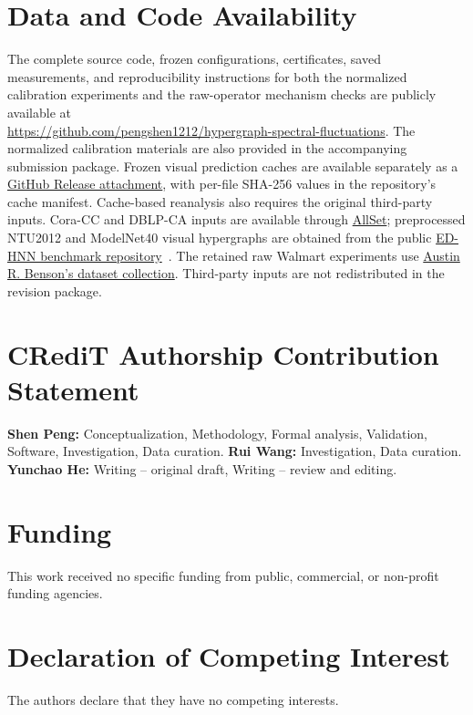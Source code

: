 \documentclass[preprint,11pt]{elsarticle}
\begin{document}
\section*{Data and Code Availability}
The complete source code, frozen configurations, certificates, saved
measurements, and reproducibility instructions for both the normalized
calibration experiments and the raw-operator mechanism checks are publicly
available at\\
\url{https://github.com/pengshen1212/hypergraph-spectral-fluctuations}.
The normalized calibration materials are also provided in the accompanying
submission package.
Frozen visual prediction caches are available separately as a
\href{https://github.com/pengshen1212/hypergraph-spectral-fluctuations/releases/tag/paper1-visual-cache-20261022}{GitHub Release attachment},
with per-file SHA-256 values in the repository's cache manifest.
Cache-based reanalysis also requires the original third-party inputs.
Cora-CC and DBLP-CA inputs are available through
\href{https://github.com/jianhao2016/AllSet}{AllSet}; preprocessed
NTU2012 and ModelNet40 visual hypergraphs are obtained from the public
\href{https://github.com/Graph-COM/ED-HNN}{ED-HNN benchmark repository}~\cite{wang2023edhnn}.
The retained raw
Walmart experiments use
\href{https://www.cs.cornell.edu/~arb/data/walmart-trips/}{Austin R. Benson's dataset collection}.
Third-party inputs are not redistributed in the revision package.

\section*{CRediT Authorship Contribution Statement}
\textbf{Shen Peng:} Conceptualization, Methodology, Formal analysis,
Validation, Software, Investigation, Data curation.
\textbf{Rui Wang:} Investigation, Data curation.
\textbf{Yunchao He:} Writing -- original draft, Writing -- review and editing.

\section*{Funding}
This work received no specific funding from public, commercial, or
non-profit funding agencies.

\section*{Declaration of Competing Interest}
The authors declare that they have no competing interests.
\end{document}
